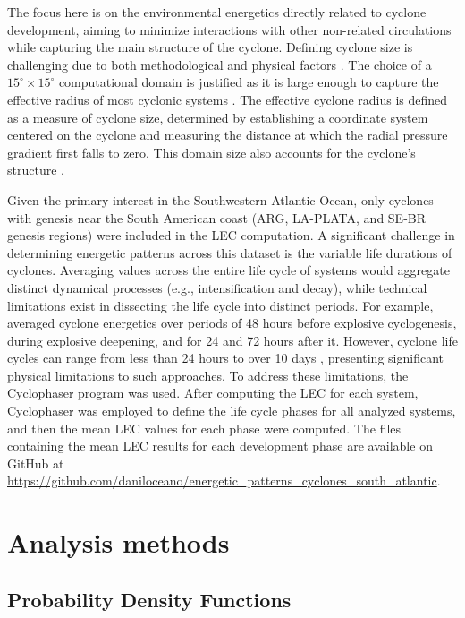 The focus here is on the environmental energetics directly related to cyclone development, aiming to minimize interactions with other non-related circulations while capturing the main structure of the cyclone. Defining cyclone size is challenging due to both methodological and physical factors \citep[e.g.]{rudeva2007climatology}. The choice of a $15^\circ \times 15^\circ$ computational domain is justified as it is large enough to capture the effective radius of most cyclonic systems \citep{rudeva2007climatology}. The effective cyclone radius is defined as a measure of cyclone size, determined by establishing a coordinate system centered on the cyclone and measuring the distance at which the radial pressure gradient first falls to zero. This domain size also accounts for the cyclone's structure \citep[e.g.]{gramcianinov2019properties}.

Given the primary interest in the Southwestern Atlantic Ocean, only cyclones with genesis near the South American coast (ARG, LA-PLATA, and SE-BR genesis regions) were included in the LEC computation. A significant challenge in determining energetic patterns across this dataset is the variable life durations of cyclones. Averaging values across the entire life cycle of systems would aggregate distinct dynamical processes (e.g., intensification and decay), while technical limitations exist in dissecting the life cycle into distinct periods. For example, \citet{black2013universal} averaged cyclone energetics over periods of 48 hours before explosive cyclogenesis, during explosive deepening, and for 24 and 72 hours after it. However, cyclone life cycles can range from less than 24 hours to over 10 days \citep{trigo2006climatology,reboita2010south,gramcianinov2019properties}, presenting significant physical limitations to such approaches. To address these limitations, the Cyclophaser program was used. After computing the LEC for each system, Cyclophaser was employed to define the life cycle phases for all analyzed systems, and then the mean LEC values for each phase were computed. The files containing the mean LEC results for each development phase are available on GitHub at \url{https://github.com/daniloceano/energetic_patterns_cyclones_south_atlantic}.

\section{Analysis methods}

\subsection{Probability Density Functions}

